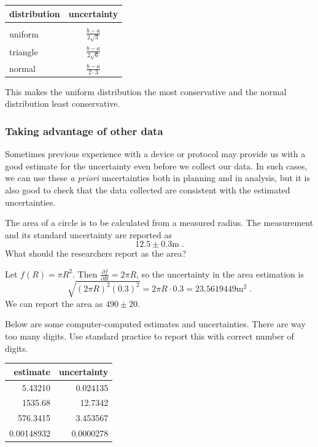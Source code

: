 \documentclass[twoside]{book}\usepackage[]{graphicx}\usepackage[]{xcolor}
\newcommand{\Partial}[2]{\frac{\partial #1}{\partial #2}}
\begin{document}
\begin{center}
	\begin{tabular}{lc}
		\hline
		distribution & uncertainty
		\\
		\hline
		\\[-3mm]
		uniform & $\displaystyle \frac{b-a}{2 \sqrt{3}}$
		\\[5mm]
		triangle & $\displaystyle \frac{b-a}{2 \sqrt{6}}$
		\\[5mm]
		normal & $\displaystyle \frac{b-a}{2 \cdot 3}$
		\\[3mm]
		\hline
	\end{tabular}
\end{center}
This makes the uniform distribution the most conservative and the normal distribution
least conservative.


\subsubsection{Taking advantage of other data}

Sometimes previous experience with a device or protocol may provide us with a good 
estimate for the uncertainty even before we collect our data.  In such cases, we can 
use these \emph{a priori} uncertainties both in planning and in analysis, but it is also
good to check that the data collected are consistent with the estimated uncertainties.


\begin{problem}
The area of a circle is to be calculated from a measured radius.  The measurement and its
standard uncertainty are reported as 
\[
12.5 \pm 0.3 \mbox{m} \;.
\]
What should the researchers report as the area?
\end{problem}

\begin{solution}
Let $f(R) = \pi R^2$.  Then $\Partial{f}{R} = 2\pi R$, so the uncertainty in the area estimation
is 
\[
\sqrt{ (2 \pi R)^2 (0.3)^2 } = 2 \pi R \cdot 0.3  = 23.5619449 
\mathrm{m}^2
\;.
\]
We can report the area as 
$490 \pm 20$.
\end{solution}


\begin{problem}
	Below are some computer-computed estimates and uncertainties.  There are way too
	many digits.  Use standard practice to report this with correct number of digits.

	\begin{center}
	\begin{tabular}{rr}
		\hline
		estimate & uncertainty
		\\
		\hline
		5.43210 & 0.024135
		\\
		1535.68 & 12.7342 
		\\
		576.3415 & 3.453567
		\\
		0.00148932 & 0.0000278
		\\
		\hline
	\end{tabular}
	\end{center}
\end{problem}
\end{document}
